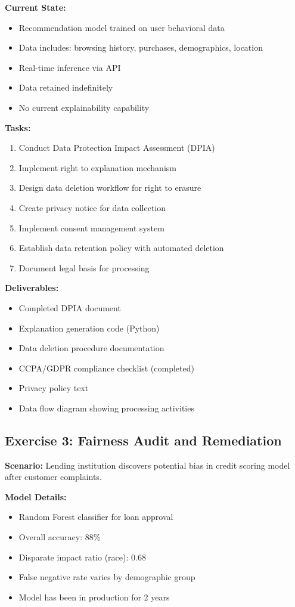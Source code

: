 \textbf{Current State:}
\begin{itemize}
    \item Recommendation model trained on user behavioral data
    \item Data includes: browsing history, purchases, demographics, location
    \item Real-time inference via API
    \item Data retained indefinitely
    \item No current explainability capability
\end{itemize}

\textbf{Tasks:}
\begin{enumerate}
    \item Conduct Data Protection Impact Assessment (DPIA)
    \item Implement right to explanation mechanism
    \item Design data deletion workflow for right to erasure
    \item Create privacy notice for data collection
    \item Implement consent management system
    \item Establish data retention policy with automated deletion
    \item Document legal basis for processing
\end{enumerate}

\textbf{Deliverables:}
\begin{itemize}
    \item Completed DPIA document
    \item Explanation generation code (Python)
    \item Data deletion procedure documentation
    \item CCPA/GDPR compliance checklist (completed)
    \item Privacy policy text
    \item Data flow diagram showing processing activities
\end{itemize}

\subsection{Exercise 3: Fairness Audit and Remediation}

\textbf{Scenario:} Lending institution discovers potential bias in credit scoring model after customer complaints.

\textbf{Model Details:}
\begin{itemize}
    \item Random Forest classifier for loan approval
    \item Overall accuracy: 88\%
    \item Disparate impact ratio (race): 0.68
    \item False negative rate varies by demographic group
    \item Model has been in production for 2 years
\end{itemize}

